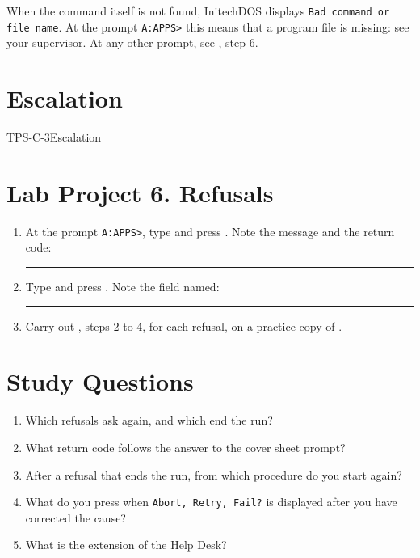 When the command itself is not found, InitechDOS displays \texttt{Bad command
or file name}.  At the prompt \texttt{A:\bs APPS>} this means that a program
file is missing: see your supervisor.  At any other prompt, see
, step 6.

\section{Escalation}
\begin{Checklist}{TPS-C-3}{Escalation}
\end{Checklist}

\section{Lab Project 6. Refusals}
\begin{enumerate}
\item At the prompt \texttt{A:\bs APPS>}, type  and press
  .  Note the message and the return code:\par
  \rule{40mm}{0.4pt}
\item Type  and press .  Note the field
  named: \rule{30mm}{0.4pt}
\item Carry out , steps 2 to 4, for each refusal, on a practice copy
  of .
\end{enumerate}

\section{Study Questions}
\begin{enumerate}
\item Which refusals ask again, and which end the run?
\item What return code follows the answer  to the cover sheet
  prompt?
\item After a refusal that ends the run, from which procedure do you start
  again?
\item What do you press when \texttt{Abort, Retry, Fail?} is displayed after
  you have corrected the cause?
\item What is the extension of the Help Desk?
\end{enumerate}
